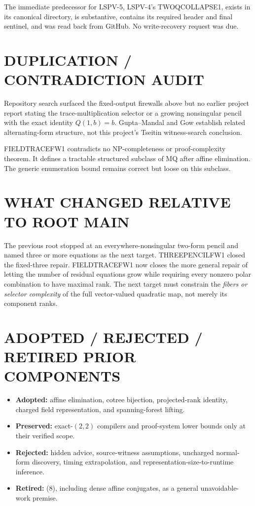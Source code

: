 \documentclass[11pt]{article}
\begin{document}
The immediate predecessor for LSPV-5, LSPV-4's TWOQCOLLAPSE1, exists in its
canonical directory, is substantive, contains its required header and final
sentinel, and was read back from GitHub.  No write-recovery request was due.

\section{DUPLICATION / CONTRADICTION AUDIT}
Repository search surfaced the fixed-output firewalls above but no earlier
project report stating the trace-multiplication selector or a growing
nonsingular pencil with the exact identity $Q(1,b)=b$.  Gupta--Mandal and Gow
establish related alternating-form structure, not this project's Tseitin
witness-search conclusion.

FIELDTRACEFW1 contradicts no NP-completeness or proof-complexity theorem.
It defines a tractable structured subclass of MQ after affine elimination.
The generic enumeration bound remains correct but loose on this subclass.

\section{WHAT CHANGED RELATIVE TO ROOT MAIN}
The previous root stopped at an everywhere-nonsingular two-form pencil and
named three or more equations as the next target.  THREEPENCILFW1 closed the
fixed-three repair.  FIELDTRACEFW1 now closes the more general repair of
letting the number of residual equations grow while requiring every nonzero
polar combination to have maximal rank.  The next target must constrain the
\emph{fibers or selector complexity} of the full vector-valued quadratic map,
not merely its component ranks.

\section{ADOPTED / REJECTED / RETIRED PRIOR COMPONENTS}
\begin{itemize}
\item \textbf{Adopted:} affine elimination, cotree bijection, projected-rank
identity, charged field representation, and spanning-forest lifting.
\item \textbf{Preserved:} exact-$(2,2)$ compilers and proof-system lower
bounds only at their verified scope.
\item \textbf{Rejected:} hidden advice, source-witness assumptions,
uncharged normal-form discovery, timing extrapolation, and
representation-size-to-runtime inference.
\item \textbf{Retired:} (8), including dense affine conjugates, as a general
unavoidable-work premise.
\end{itemize}
\end{document}

